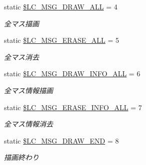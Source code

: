 \begin{DoxyCompactItemize}
\mbox{\label{class_reversi_const_a3074235c57b33980f06e0ec357302e87}} 
static \hyperlink{class_reversi_const_a3074235c57b33980f06e0ec357302e87}{\$\+L\+C\+\_\+\+M\+S\+G\+\_\+\+D\+R\+A\+W\+\_\+\+A\+LL} = 4
\begin{DoxyCompactList}\small\item\em 全マス描画 \end{DoxyCompactList}\item 
\mbox{\label{class_reversi_const_a6c2ec1c0d689ebe57d1ccd9eb9589da8}} 
static \hyperlink{class_reversi_const_a6c2ec1c0d689ebe57d1ccd9eb9589da8}{\$\+L\+C\+\_\+\+M\+S\+G\+\_\+\+E\+R\+A\+S\+E\+\_\+\+A\+LL} = 5
\begin{DoxyCompactList}\small\item\em 全マス消去 \end{DoxyCompactList}\item 
\mbox{\label{class_reversi_const_a878b3d361d535e996827103efecdbfa3}} 
static \hyperlink{class_reversi_const_a878b3d361d535e996827103efecdbfa3}{\$\+L\+C\+\_\+\+M\+S\+G\+\_\+\+D\+R\+A\+W\+\_\+\+I\+N\+F\+O\+\_\+\+A\+LL} = 6
\begin{DoxyCompactList}\small\item\em 全マス情報描画 \end{DoxyCompactList}\item 
\mbox{\label{class_reversi_const_ad45d7e4a301c2cfa4b0a12ddfa373425}} 
static \hyperlink{class_reversi_const_ad45d7e4a301c2cfa4b0a12ddfa373425}{\$\+L\+C\+\_\+\+M\+S\+G\+\_\+\+E\+R\+A\+S\+E\+\_\+\+I\+N\+F\+O\+\_\+\+A\+LL} = 7
\begin{DoxyCompactList}\small\item\em 全マス情報消去 \end{DoxyCompactList}\item 
\mbox{\label{class_reversi_const_ac5fc5dc1425fd1c238faf57d0d3d0510}} 
static \hyperlink{class_reversi_const_ac5fc5dc1425fd1c238faf57d0d3d0510}{\$\+L\+C\+\_\+\+M\+S\+G\+\_\+\+D\+R\+A\+W\+\_\+\+E\+ND} = 8
\begin{DoxyCompactList}\small\item\em 描画終わり \end{DoxyCompactList}\item 
\mbox{\label{class_reversi_const_a6acbb83271876a127eadc9eb7cb425cd}} 

\end{DoxyCompactItemize}
